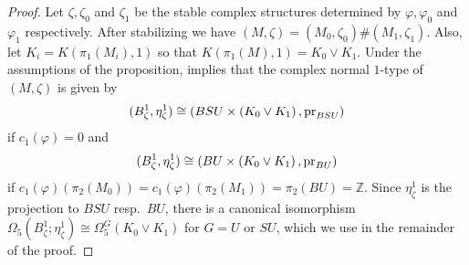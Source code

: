 \documentclass[12pt]{amsart}
\newcommand\acs{\varphi}  				%
\newcommand\scxs{\zeta}					%
\theoremstyle{remark}
\begin{document}
\begin{proof}
Let $\scxs, \scxs_0$ and $\scxs_1$ be the stable complex structures determined by $\acs, \acs_0$
and $\acs_1$ respectively.  After stabilizing we have $(M, \scxs) = (M_0, \scxs_0) \# (M_1, \scxs_1)$.
Also, let $K_i = K(\pi_1(M_i), 1)$ so that $K(\pi_1(M), 1) = K_0 \vee K_1$.
Under the assumptions of the proposition, \cite[Lemma~2.13]{BCS2} implies that the complex normal
$1$-type of $(M, \scxs)$ is given by
%
\[ 
(B^1_\scxs, \eta^1_\scxs) \cong (BSU \times 
\left( K_0 \vee K_1 \right), 
{\rm pr}_{BSU}) 
\]
%
if $c_1(\acs) = 0$ and
%
\[ 
(B^1_\scxs, \eta^1_\scxs) \cong (BU \times 
\left( K_0 \vee K_1 \right), 
{\rm pr}_{BU}) 
\]
if $c_1(\acs)(\pi_2(M_0)) =c_1(\acs)(\pi_2(M_1))= \pi_2(BU)  = \mathbb{Z}$. 
Since $\eta^1_\scxs$ is the projection to $BSU$
resp.\ $BU$, there is a canonical isomorphism 
$\Omega_5(B^1_\zeta; \eta^1_\zeta) \cong \Omega_5^G(K_0 \vee K_1)$ for $G = U$ or $SU$,
which we use in the remainder of the proof.


\end{proof}
\end{document}
